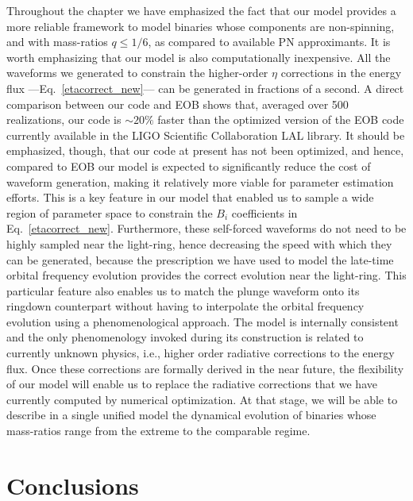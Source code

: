 Throughout the chapter we have emphasized the fact that our model provides a more reliable framework to model binaries whose components are non-spinning, and with mass-ratios \(q\leq 1/6\), as compared to available PN approximants. It is worth emphasizing that our model is also computationally inexpensive. All the waveforms we generated to constrain the higher-order \(\eta\) corrections in the energy flux ---Eq.~\eqref{etacorrect_new}--- can be generated in fractions of a second. A direct comparison between our code and EOB shows that, averaged over 500 realizations, our code is \(\sim20\%\) faster than the optimized version of the EOB code currently available in the LIGO Scientific Collaboration LAL library. It should be emphasized, though, that our code at present has not been optimized, and hence, compared to EOB our model is expected to significantly reduce the cost of waveform generation, making it relatively more viable for parameter estimation efforts. This is a key feature in our model that enabled 
us 
to sample a wide region of parameter space to constrain the \(B_i\) coefficients in Eq.~\eqref{etacorrect_new}. Furthermore, these self-forced waveforms do not need to be highly sampled near the light-ring, hence decreasing the speed with which they can be generated, because the prescription we have used to model the late-time orbital frequency evolution provides the correct evolution near the light-ring. This particular feature also enables us to match the plunge waveform onto its ringdown counterpart without having to interpolate the orbital frequency evolution using a phenomenological approach. The model is internally consistent and the only phenomenology invoked during its construction is related to currently unknown physics, i.e., higher order radiative corrections to the energy flux. Once these corrections are formally derived in the near future, the flexibility of our model will enable us to replace the radiative corrections that we have currently computed by numerical optimization.  At that stage, we 
will be able to describe in a single unified model the dynamical evolution of binaries whose mass-ratios range from the extreme to the comparable regime. 

\section{Conclusions}
\label{conclu}

